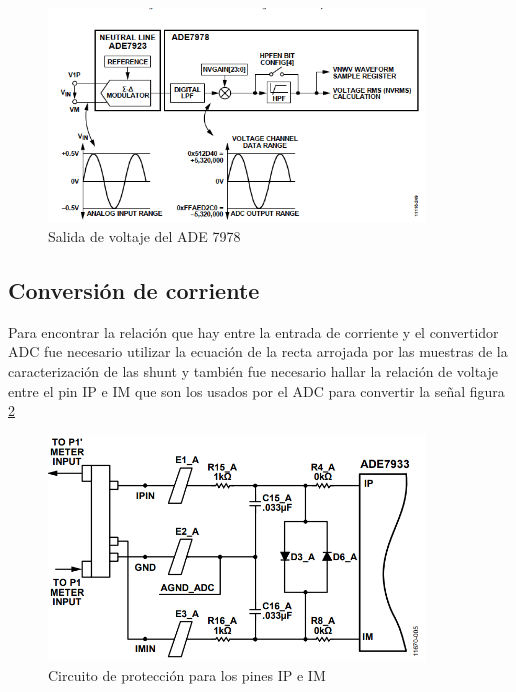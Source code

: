         \begin{figure}[H]
            \centering
            \includegraphics[width = 10cm]{3Proyecto/voltageOutput}
            \caption{Salida de voltaje del ADE 7978} 
            \label{fig:voltageOutput}
        \end{figure} 


    \subsection{Conversión de corriente}
        Para encontrar la relación que hay entre la entrada de corriente y el convertidor ADC fue necesario utilizar la ecuación de la recta arrojada por las muestras de la caracterización de las shunt y también fue necesario hallar la relación de voltaje entre el pin IP e IM que son los usados por el ADC para convertir la señal figura \ref{fig:CircuitoCorriente}


        \begin{figure}[H]
            \begin{center}
                \includegraphics[width = 10cm]{3Proyecto/CircuitoCorriente.PNG}
                \caption{ Circuito de protección para los pines IP e IM } 
                \label{fig:CircuitoCorriente}
            \end{center}
        \end{figure}

